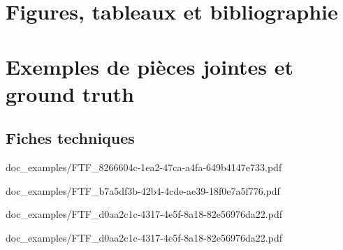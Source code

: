 \documentclass{report}
\begin{document}
    \chapter{Figures, tableaux et bibliographie}
        \listoftables
        \listoffigures
        
        
        
        





    \chapter{Exemples de pièces jointes et ground truth}
        \section{Fiches techniques}
        \label{ex:fiches_techniques}
        
                    {doc_examples/FTF_8266604c-1ea2-47ca-a4fa-649b4147e733.pdf}
%        

        
                    {doc_examples/FTF_b7a5df3b-42b4-4cde-ae39-18f0e7a5f776.pdf}
%        

        
                    {doc_examples/FTF_d0aa2c1c-4317-4e5f-8a18-82e56976da22.pdf}
        
                    {doc_examples/FTF_d0aa2c1c-4317-4e5f-8a18-82e56976da22.pdf}
\end{document}
